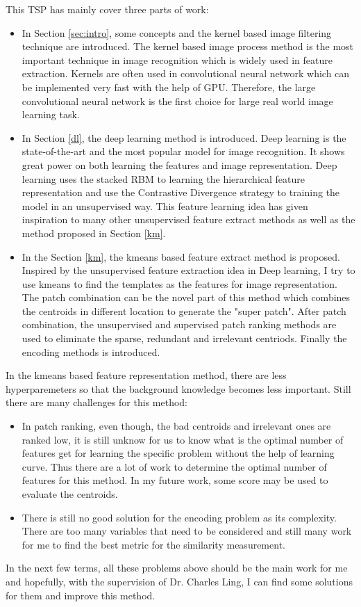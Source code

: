 ﻿This TSP has mainly cover three parts of work:
\begin{itemize}
  \item In Section \ref{sec:intro}, some concepts and the kernel based image filtering technique are introduced. The kernel based image process method is the most important technique in image recognition which is widely used in feature extraction. Kernels are often used in convolutional neural network which can be implemented very fast with the help of GPU. Therefore, the large convolutional neural network is the first choice for large real world image learning task. 
  \item In Section \ref{dl}, the deep learning method is introduced. Deep learning is the state-of-the-art and the most popular model for image recognition. It shows great power on both learning the features and image representation. Deep learning uses the stacked RBM to learning the hierarchical feature representation and use the Contrastive Divergence strategy to training the model in an unsupervised way. This feature learning idea has given inspiration to many other unsupervised feature extract methods as well as the method proposed in Section \ref{km}.
  \item In the Section \ref{km}, the kmeans based feature extract method is proposed. Inspired by the unsupervised feature extraction idea in Deep learning, I try to use kmeans to find the templates as the features for image representation. The patch combination can be the novel part of this method which combines the centroids in different location to generate the "super patch". After patch combination, the unsupervised and supervised patch ranking methods are used to eliminate the sparse, redundant and irrelevant centriods. Finally the encoding methods is introduced.
\end{itemize}

In the kmeans based feature representation method, there are less hyperparemeters so that the background knowledge becomes less important. Still there are many challenges for this method: 
\begin{itemize}
  \item In patch ranking, even though, the bad centroids and irrelevant ones are ranked low, it is still unknow for us to know what is the optimal number of features get for learning the specific problem without the help of learning curve. Thus there are a lot of work to determine the optimal number of features for this method. In my future work, some score may be used to evaluate the centroids.
  \item There is still no good solution for the encoding problem as its complexity. There are too many variables that need to be considered and still many work for me to find the best metric for the similarity measurement.
\end{itemize}
In the next few terms, all these problems above should be the main work for me and hopefully, with the supervision of Dr. Charles Ling, I can find some solutions for them and improve this method. 